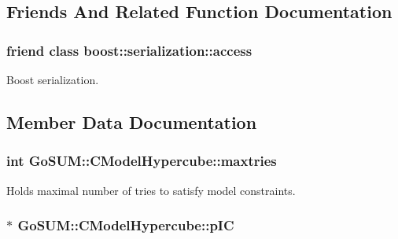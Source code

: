 \subsection{Friends And Related Function Documentation}
\hypertarget{class_go_s_u_m_1_1_c_model_hypercube_ac98d07dd8f7b70e16ccb9a01abf56b9c}{
\subsubsection[{boost\-::serialization\-::access}]{\setlength{\rightskip}{0pt plus 5cm}friend class boost\-::serialization\-::access\hspace{0.3cm}{\ttfamily [friend]}}}\label{class_go_s_u_m_1_1_c_model_hypercube_ac98d07dd8f7b70e16ccb9a01abf56b9c}


Boost serialization. 



\subsection{Member Data Documentation}
\hypertarget{class_go_s_u_m_1_1_c_model_hypercube_a2b0d3bcbf328d89f7bcb3706795dbbc4}{
\subsubsection[{maxtries}]{\setlength{\rightskip}{0pt plus 5cm}int Go\-S\-U\-M\-::\-C\-Model\-Hypercube\-::maxtries\hspace{0.3cm}{\ttfamily [protected]}}}\label{class_go_s_u_m_1_1_c_model_hypercube_a2b0d3bcbf328d89f7bcb3706795dbbc4}
Holds maximal number of tries to satisfy model constraints. \hypertarget{class_go_s_u_m_1_1_c_model_hypercube_afefc6601f2bb4b95c7bd56250fcef2c4}{
\subsubsection[{p\-I\-C}]{$\ast$ Go\-S\-U\-M\-::\-C\-Model\-Hypercube\-::p\-I\-C\hspace{0.3cm}{\ttfamily [protected]}}}\label{class_go_s_u_m_1_1_c_model_hypercube_afefc6601f2bb4b95c7bd56250fcef2c4}


